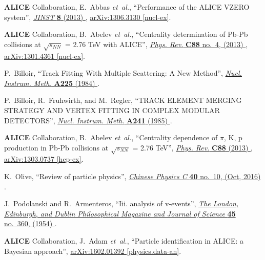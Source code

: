 \documentclass[ALICE,manyauthors]{cernphprep}
\begin{document}
\begin{thebibliography}{10}
{\bfseries ALICE} Collaboration, E.~Abbas {\em et~al.}, ``{Performance of the
  ALICE VZERO system}'',
  \href{http://dx.doi.org/10.1088/1748-0221/8/10/P10016}{{\em JINST} {\bfseries
  8} (2013) },
\href{http://arxiv.org/abs/1306.3130}{{\ttfamily arXiv:1306.3130 [nucl-ex]}}.

{\bfseries ALICE} Collaboration, B.~Abelev {\em et~al.}, ``{Centrality
  determination of Pb-Pb collisions at $\sqrt{s_{NN}}$ = 2.76 TeV with
  ALICE}'', \href{http://dx.doi.org/10.1103/PhysRevC.88.044909}{{\em Phys.
  Rev.} {\bfseries C88} no.~4, (2013) },
\href{http://arxiv.org/abs/1301.4361}{{\ttfamily arXiv:1301.4361 [nucl-ex]}}.

P.~Billoir, ``{Track Fitting With Multiple Scattering: A New Method}'',
\href{http://dx.doi.org/10.1016/0167-5087(84)90274-6}{{\em Nucl. Instrum.
  Meth.} {\bfseries A225} (1984) }.

P.~Billoir, R.~Fruhwirth, and M.~Regler, ``{TRACK ELEMENT MERGING STRATEGY AND
  VERTEX FITTING IN COMPLEX MODULAR DETECTORS}'',
\href{http://dx.doi.org/10.1016/0168-9002(85)90523-6}{{\em Nucl. Instrum.
  Meth.} {\bfseries A241} (1985) }.

{\bfseries ALICE} Collaboration, B.~Abelev {\em et~al.}, ``{Centrality
  dependence of $\pi$, K, p production in Pb-Pb collisions at $\sqrt{s_{NN}}$ =
  2.76 TeV}'', \href{http://dx.doi.org/10.1103/PhysRevC.88.044910}{{\em Phys.
  Rev.} {\bfseries C88} (2013) },
\href{http://arxiv.org/abs/1303.0737}{{\ttfamily arXiv:1303.0737 [hep-ex]}}.

K.~Olive, ``Review of particle physics'',
  \href{http://dx.doi.org/10.1088/1674-1137/40/10/100001}{{\em Chinese Physics
  C} {\bfseries 40} no.~10, (Oct, 2016) }.

J.~Podolanski and R.~Armenteros, ``Iii. analysis of v-events'',
  \href{http://dx.doi.org/10.1080/14786440108520416}{{\em The London,
  Edinburgh, and Dublin Philosophical Magazine and Journal of Science}
  {\bfseries 45} no.~360, (1954) }.

{\bfseries ALICE} Collaboration, J.~Adam {\em et~al.}, ``{Particle
  identification in ALICE: a Bayesian approach}'',
\href{http://arxiv.org/abs/1602.01392}{{\ttfamily arXiv:1602.01392
  [physics.data-an]}}.


\end{thebibliography}
\end{document}
